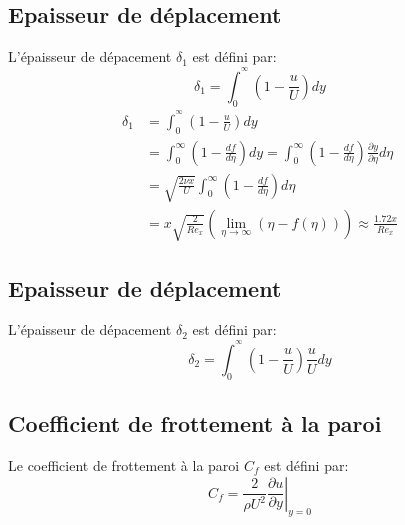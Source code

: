 \documentclass[french]{article}
\begin{document}
\subsection{Epaisseur de déplacement}
L'épaisseur de dépacement $\delta_{1}$ est défini par:
\begin{equation}
	\delta_{1} = 
	\int_{0}^{^\infty}
	\left(
	1 - 
	\frac{u}{U}
	\right)
	dy
\end{equation}
\begin{align*}
	\delta_{1} &= 
	\int_{0}^{^\infty}
	\left(
	1 - 
	\frac{u}{U}
	\right)
	dy\\
	&= \int_{0}^{\infty}
	\left(
	1 - \frac{df}{d\eta}
	\right)
	dy 
	= \int_{0}^{\infty}
	\left(
	1 - \frac{df}{d\eta}
	\right)
	\frac{\partial y}{\partial \eta}d\eta\\
	&= \sqrt{\frac{2\nu x}{U}}
	\int_{0}^{\infty}
	\left(
	1 - \frac{df}{d\eta}
	\right)
	d\eta\\
	&= x\sqrt{\frac{2}{Re_{x}}}
	\left(
	\lim_{\eta\to\infty}
	\left(
	\eta - f(\eta)
	\right)
	\right)
	\approx \frac{1.72x}{Re_{x}}
\end{align*}
\subsection{Epaisseur de déplacement}
L'épaisseur de dépacement $\delta_{2}$ est défini par:
\begin{equation}
	\delta_{2} = 
	\int_{0}^{^\infty}
	\left(
	1 - 
	\frac{u}{U}
	\right)
	\frac{u}{U}
	dy
\end{equation}
\subsection{Coefficient de frottement à la paroi}
Le coefficient de frottement à la paroi $C_{f}$ est défini par:
\begin{equation}
	C_{f} = 
	\frac{2}{\rho U^{2}}
	\left.
	\frac{\partial u}{\partial y}
	\right|_{y = 0}
\end{equation}
\end{document}
